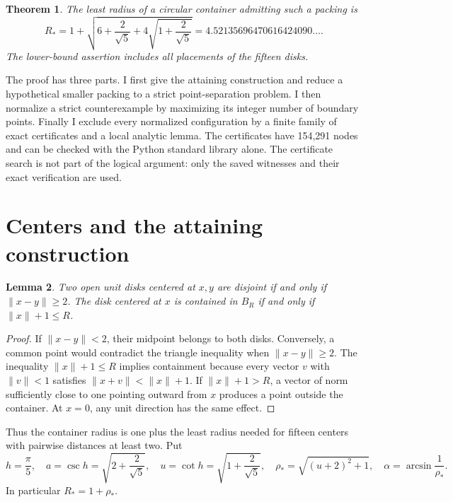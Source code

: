 \documentclass[11pt]{amsart}
\newtheorem{theorem}{Theorem}[section]
\newtheorem{lemma}[theorem]{Lemma}
\theoremstyle{definition}
\theoremstyle{remark}
\numberwithin{equation}{section}
\newcommand{\norm}[1]{\lVert #1\rVert}
\newcommand{\rhoopt}{\rho_*}
\newcommand{\Ropt}{R_*}
\begin{document}
\begin{theorem}\label{thm:main}
The least radius of a circular container admitting such a packing is
\begin{equation}\label{eq:radius}
 \Ropt=1+\sqrt{6+\frac{2}{\sqrt5}+4\sqrt{1+\frac{2}{\sqrt5}}}
       =4.52135696470616424090\ldots.
\end{equation}
The lower-bound assertion includes all placements of the fifteen disks.
\end{theorem}

The proof has three parts. I first give the attaining construction and
reduce a hypothetical smaller packing to a strict point-separation problem.
I then normalize a strict counterexample by maximizing its integer number
of boundary points. Finally I exclude every normalized configuration by a
finite family of exact certificates and a local analytic lemma. The
certificates have 154,291 nodes and can be checked with the Python standard
library alone. The certificate search is not part of the logical argument:
only the saved witnesses and their exact verification are used.

\section{Centers and the attaining construction}

\begin{lemma}\label{lem:centers}
Two open unit disks centered at $x,y$ are disjoint if and only if
$\norm{x-y}\geq2$. The disk centered at $x$ is contained in $B_R$ if and
only if $\norm{x}+1\leq R$.
\end{lemma}
\begin{proof}
If $\norm{x-y}<2$, their midpoint belongs to both disks. Conversely, a common
point would contradict the triangle inequality when $\norm{x-y}\geq2$.
The inequality $\norm{x}+1\leq R$ implies containment because every vector
$v$ with $\norm{v}<1$ satisfies $\norm{x+v}<\norm{x}+1$. If
$\norm{x}+1>R$, a vector of norm sufficiently close to one pointing outward
from $x$ produces a point outside the container. At $x=0$, any unit
direction has the same effect.
\end{proof}

Thus the container radius is one plus the least radius needed for fifteen
centers with pairwise distances at least two. Put
\begin{equation}\label{eq:constants}
 h=\frac\pi5,\quad
 a=\csc h=\sqrt{2+\frac2{\sqrt5}},\quad
 u=\cot h=\sqrt{1+\frac2{\sqrt5}},\quad
 \rhoopt=\sqrt{(u+2)^2+1},\quad
 \alpha=\arcsin\frac1{\rhoopt}.
\end{equation}
In particular $\Ropt=1+\rhoopt$.
\end{document}
